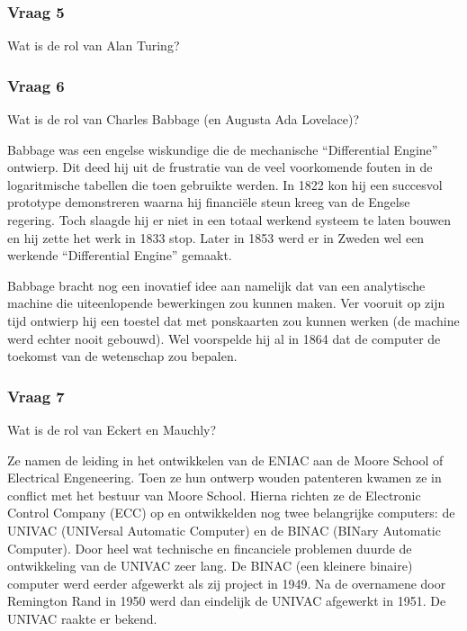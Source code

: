 \documentclass[../main.tex]{subfiles}
\begin{document}
\subsubsection{Vraag 5}
\begin{question}
Wat is de rol van Alan Turing?
\end{question}


\subsubsection{Vraag 6}
\begin{question}
Wat is de rol van Charles Babbage (en Augusta Ada Lovelace)?
\end{question}
\begin{solution}
Babbage was een engelse wiskundige die de mechanische ``Differential Engine'' ontwierp.
Dit deed hij uit de frustratie van de veel voorkomende fouten in de logaritmische tabellen die toen gebruikte werden.
In 1822 kon hij een succesvol prototype demonstreren waarna hij financi\"ele steun kreeg van de Engelse regering.
Toch slaagde hij er niet in een totaal werkend systeem te laten bouwen en hij zette het werk in 1833 stop.
Later in 1853 werd er in Zweden wel een werkende ``Differential Engine'' gemaakt. 

Babbage bracht nog een inovatief idee aan namelijk dat van een analytische machine die uiteenlopende bewerkingen zou kunnen maken.
Ver vooruit op zijn tijd ontwierp hij een toestel dat met ponskaarten zou kunnen werken (de machine werd echter nooit gebouwd).
Wel voorspelde hij al in 1864 dat de computer de toekomst van de wetenschap zou bepalen.

\end{solution}

\subsubsection{Vraag 7}
\begin{question}
Wat is de rol van Eckert en Mauchly?
\end{question}
\begin{solution}
Ze namen de leiding in het ontwikkelen van de ENIAC aan de Moore School of Electrical Engeneering.
Toen ze hun ontwerp wouden patenteren kwamen ze in conflict met het bestuur van Moore School.
Hierna richten ze de Electronic Control Company (ECC) op en ontwikkelden nog twee belangrijke computers: de UNIVAC (UNIVersal Automatic Computer) en de BINAC (BINary Automatic Computer).
Door heel wat technische en fincanciele problemen duurde de ontwikkeling van de UNIVAC zeer lang. 
De BINAC (een kleinere binaire) computer werd eerder afgewerkt als zij project in 1949.
Na de overnamene door Remington Rand in 1950 werd dan eindelijk de UNIVAC afgewerkt in 1951. 
De UNIVAC raakte er bekend.
\end{solution}
\end{document}
